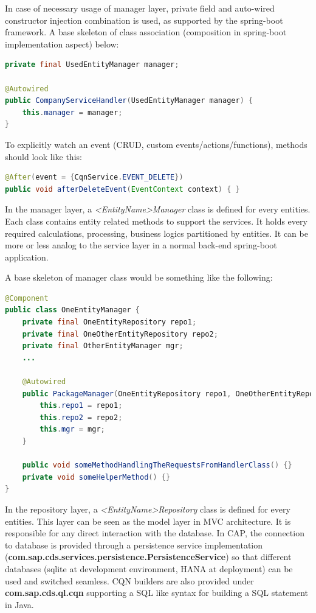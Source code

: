 In case of necessary usage of manager layer, private field and auto-wired constructor injection combination is used, as supported by the spring-boot framework. A base skeleton of class association (composition in spring-boot implementation aspect) below:

\begin{lstlisting}[language={java}]
private final UsedEntityManager manager;

@Autowired
public CompanyServiceHandler(UsedEntityManager manager) {
    this.manager = manager;
}
\end{lstlisting}

To explicitly watch an event (CRUD, custom events/actions/functions), methods should look like this:
\begin{lstlisting}[language={java}]
@After(event = {CqnService.EVENT_DELETE})
public void afterDeleteEvent(EventContext context) { }
\end{lstlisting}

\bigskip
In the manager layer, a \textit{<EntityName>Manager} class is defined for every entities. Each class contains entity related methods to support the services. It holds every required calculations, processing, business logics partitioned by entities. It can be more or less analog to the service layer in a normal back-end spring-boot application.

A base skeleton of manager class would be something like the following:

\begin{lstlisting}[language={java}]
@Component
public class OneEntityManager {
    private final OneEntityRepository repo1;
    private final OneOtherEntityRepository repo2;
    private final OtherEntityManager mgr;
    ...

    @Autowired
    public PackageManager(OneEntityRepository repo1, OneOtherEntityRepository repo2, OtherEntityManager mgr) {
        this.repo1 = repo1;
        this.repo2 = repo2;
        this.mgr = mgr;
    }

    public void someMethodHandlingTheRequestsFromHandlerClass() {}
    private void someHelperMethod() {}
}
\end{lstlisting}


\bigskip
In the repository layer, a \textit{<EntityName>Repository} class is defined for every entities. This layer can be seen as the model layer in MVC architecture. It is responsible for any direct interaction with the database. In CAP, the connection to database is provided through a persistence service implementation (\textbf{com.sap.cds.services.persistence.PersistenceService}) so that different databases (sqlite at development environment, HANA at deployment) can be used and switched seamless. CQN builders are also provided under \textbf{com.sap.cds.ql.cqn} supporting a SQL like syntax for building a SQL statement in Java.


